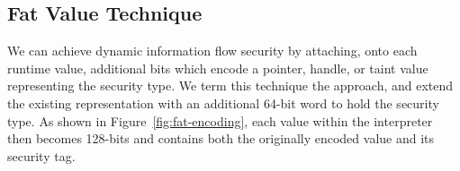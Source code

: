 \begin{comment}
         *     False:     0x06 =     4 + 2
         *     True:      0x07 =     4 + 2 + 1
         *     Undefined: 0x0a = 8     + 2
         *     Null:      0x02 =         2

         * These values have the following properties:
         * - Bit 1 (TagBitTypeOther) is set for all four values, allowing real pointers to be
         *   quickly distinguished from all immediate values, including these invalid pointers.
         * - With bit 3 is masked out (TagBitUndefined) Undefined and Null share the
         *   same value, allowing null & undefined to be quickly detected.
         *
         *     Deleted:   0x0
         *     Empty:   0x4
         * No valid JSValue will have the bit pattern 0x0, this is used to represent array
         * holes, and as a C++ 'no value' result (e.g. JSValue() has an internal value of 0).
        // These special values are never visible to JavaScript code; Empty is used to represent
        // Array holes, and for uninitialized JSValues. Deleted is used in hash table code.
        // These values would map to cell types in the JSValue encoding, but not valid GC cell
        // pointer should have either of these values (Empty is null, deleted is at an invalid
        // alignment for a GC cell, and in the zero page).
         */
\end{comment}

\subsection{Fat Value Technique}\label{sec:fat-values}
We can achieve dynamic information flow security by attaching, onto each runtime value, additional bits which encode a pointer, handle, or taint value representing the security type.
We term this technique the  approach, and extend the existing  representation with an additional 64-bit word to hold the security type.
As shown in Figure~\ref{fig:fat-encoding}, each value within the interpreter then becomes 128-bits and contains both the originally encoded value and its security tag.

